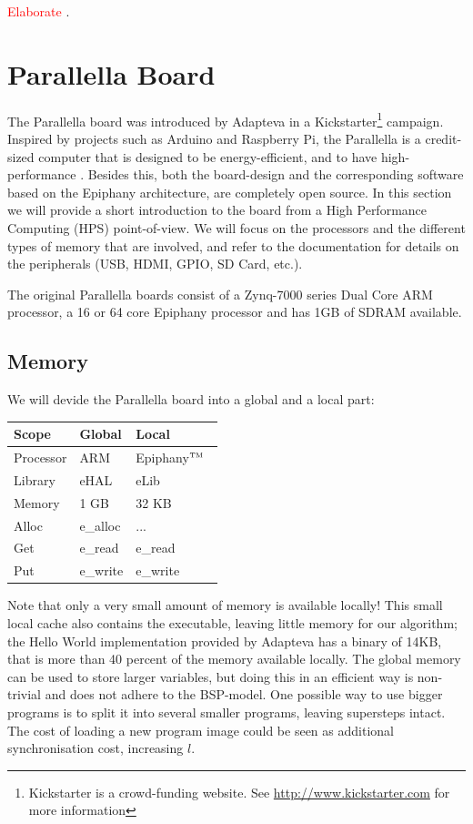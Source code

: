 \documentclass[fleqn]{article}
\renewcommand{\(}{\left(}
\renewcommand{\)}{\right)}
\newcommand{\todo}[1]{\textcolor{red}{#1}}
\def\tm{$^{\hbox{\tiny TM}}$~}
\begin{document}
\todo{Elaborate} \cite{bsp:bisseling}.

\section{Parallella Board}

The Parallella board was introduced by Adapteva in a Kickstarter\footnote{Kickstarter is a crowd-funding website. See \url{http://www.kickstarter.com} for more information} campaign. Inspired by projects such as Arduino and Raspberry Pi, the Parallella is a credit-sized computer that is designed to be energy-efficient, and to have high-performance \cite{par:manual}. Besides this, both the board-design and the corresponding software based on the Epiphany architecture, are completely open source. In this section we will provide a short introduction to the board from a High Performance Computing (HPS) point-of-view. We will focus on the processors and the different types of memory that are involved, and refer to the documentation for details on the peripherals (USB, HDMI, GPIO, SD Card, etc.). 

The original Parallella boards consist of a Zynq-7000 series Dual Core ARM processor, a 16 or 64 core Epiphany processor and has 1GB of SDRAM available.



\subsection{Memory}

We will devide the Parallella board into a global and a local part:

\begin{tabular}{l|ll}
Scope & Global & Local \\
\hline
Processor & ARM & Epiphany\tm \\
Library & eHAL & eLib \\
Memory & 1 GB & 32 KB \\
Alloc & e\_alloc & ... \\
Get & e\_read & e\_read \\
Put & e\_write & e\_write \\

\end{tabular}

Note that only a very small amount of memory is available locally! This small local cache also contains the executable, leaving little memory for our algorithm; the Hello World implementation provided by Adapteva has a binary of 14KB, that is more than 40 percent of the memory available locally. The global memory can be used to store larger variables, but doing this in an efficient way is non-trivial and does not adhere to the BSP-model. One possible way to use bigger programs is to split it into several smaller programs, leaving supersteps intact. The cost of loading a new program image could be seen as additional synchronisation cost, increasing $l$.
\end{document}
